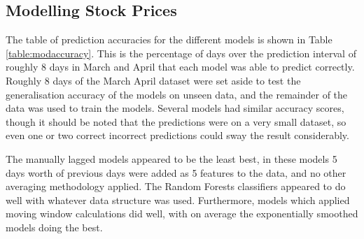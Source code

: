 \subsection{Modelling Stock Prices}
The table of prediction accuracies for the different models is shown in Table \ref{table:modaccuracy}. This is the percentage of days over the prediction interval of roughly 8 days in March and April that each model was able to predict correctly. Roughly 8 days of the March April dataset were set aside to test the generalisation accuracy of the models on unseen data, and the remainder of the data was used to train the models. Several models had similar accuracy scores, though it should be noted that the predictions were on a very small dataset, so even one or two correct incorrect predictions could sway the result considerably. 

The manually lagged models appeared to be the least best, in these models 5 days worth of previous days were added as 5 features to the data, and no other averaging methodology applied. The Random Forests classifiers appeared to do well with whatever data structure was used. Furthermore, models which applied moving window calculations did well, with on average the exponentially smoothed models doing the best.

